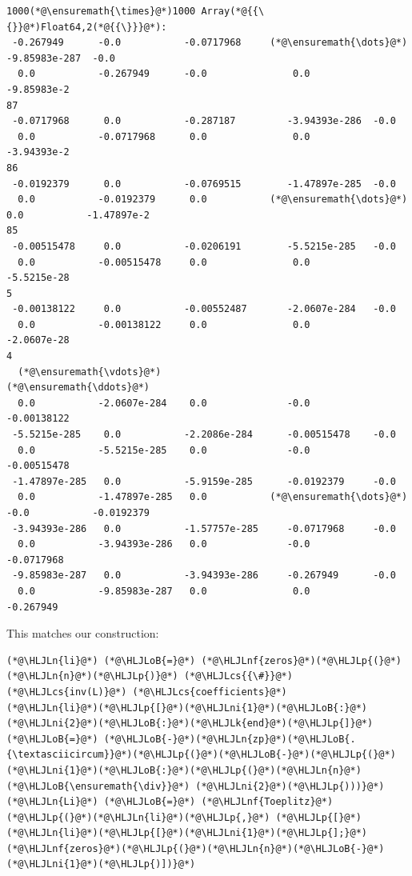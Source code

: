 \documentclass[12pt,a4paper]{article}
\newcommand{\HLJLk}[1]{\textcolor[RGB]{148,91,176}{\textbf{#1}}}
\newcommand{\HLJLn}[1]{#1}
\newcommand{\HLJLnf}[1]{\textcolor[RGB]{66,102,213}{#1}}
\newcommand{\HLJLni}[1]{\textcolor[RGB]{59,151,46}{#1}}
\newcommand{\HLJLoB}[1]{\textcolor[RGB]{102,102,102}{\textbf{#1}}}
\newcommand{\HLJLp}[1]{#1}
\newcommand{\HLJLcs}[1]{\textcolor[RGB]{153,153,119}{\textit{#1}}}
\begin{document}
\begin{lstlisting}
1000(*@\ensuremath{\times}@*)1000 Array(*@{{\{}}@*)Float64,2(*@{{\}}}@*):
 -0.267949      -0.0           -0.0717968     (*@\ensuremath{\dots}@*)  -9.85983e-287  -0.0
  0.0           -0.267949      -0.0               0.0           -9.85983e-2
87
 -0.0717968      0.0           -0.287187         -3.94393e-286  -0.0
  0.0           -0.0717968      0.0               0.0           -3.94393e-2
86
 -0.0192379      0.0           -0.0769515        -1.47897e-285  -0.0
  0.0           -0.0192379      0.0           (*@\ensuremath{\dots}@*)   0.0           -1.47897e-2
85
 -0.00515478     0.0           -0.0206191        -5.5215e-285   -0.0
  0.0           -0.00515478     0.0               0.0           -5.5215e-28
5
 -0.00138122     0.0           -0.00552487       -2.0607e-284   -0.0
  0.0           -0.00138122     0.0               0.0           -2.0607e-28
4
  (*@\ensuremath{\vdots}@*)                                           (*@\ensuremath{\ddots}@*)                 
  0.0           -2.0607e-284    0.0              -0.0           -0.00138122
 -5.5215e-285    0.0           -2.2086e-284      -0.00515478    -0.0
  0.0           -5.5215e-285    0.0              -0.0           -0.00515478
 -1.47897e-285   0.0           -5.9159e-285      -0.0192379     -0.0
  0.0           -1.47897e-285   0.0           (*@\ensuremath{\dots}@*)  -0.0           -0.0192379
 -3.94393e-286   0.0           -1.57757e-285     -0.0717968     -0.0
  0.0           -3.94393e-286   0.0              -0.0           -0.0717968
 -9.85983e-287   0.0           -3.94393e-286     -0.267949      -0.0
  0.0           -9.85983e-287   0.0               0.0           -0.267949
\end{lstlisting}


This matches our construction:


\begin{lstlisting}
(*@\HLJLn{li}@*) (*@\HLJLoB{=}@*) (*@\HLJLnf{zeros}@*)(*@\HLJLp{(}@*)(*@\HLJLn{n}@*)(*@\HLJLp{)}@*) (*@\HLJLcs{{\#}}@*) (*@\HLJLcs{inv(L)}@*) (*@\HLJLcs{coefficients}@*)
(*@\HLJLn{li}@*)(*@\HLJLp{[}@*)(*@\HLJLni{1}@*)(*@\HLJLoB{:}@*)(*@\HLJLni{2}@*)(*@\HLJLoB{:}@*)(*@\HLJLk{end}@*)(*@\HLJLp{]}@*) (*@\HLJLoB{=}@*) (*@\HLJLoB{-}@*)(*@\HLJLn{zp}@*)(*@\HLJLoB{.{\textasciicircum}}@*)(*@\HLJLp{(}@*)(*@\HLJLoB{-}@*)(*@\HLJLp{(}@*)(*@\HLJLni{1}@*)(*@\HLJLoB{:}@*)(*@\HLJLp{(}@*)(*@\HLJLn{n}@*) (*@\HLJLoB{\ensuremath{\div}}@*) (*@\HLJLni{2}@*)(*@\HLJLp{)))}@*)
(*@\HLJLn{Li}@*) (*@\HLJLoB{=}@*) (*@\HLJLnf{Toeplitz}@*)(*@\HLJLp{(}@*)(*@\HLJLn{li}@*)(*@\HLJLp{,}@*) (*@\HLJLp{[}@*)(*@\HLJLn{li}@*)(*@\HLJLp{[}@*)(*@\HLJLni{1}@*)(*@\HLJLp{];}@*) (*@\HLJLnf{zeros}@*)(*@\HLJLp{(}@*)(*@\HLJLn{n}@*)(*@\HLJLoB{-}@*)(*@\HLJLni{1}@*)(*@\HLJLp{)])}@*)
\end{lstlisting}
\end{document}
